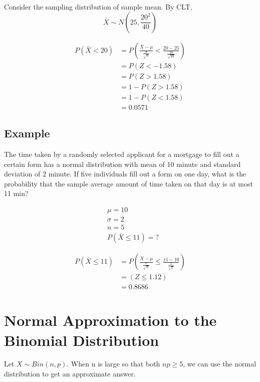 \documentclass{article}
\begin{document}
    Consider the sampling distribution of sample mean. By CLT, 
    \begin{equation*}
        \bar{X} \sim N(25, \frac{20^{2}}{40})
    \end{equation*}

    \begin{align*}
        P(\bar{X} < 20) &= P(\frac{\bar{X} - \mu}{ \frac{\sigma}{\sqrt{n}}} < \frac{20-25}{\frac{20}{\sqrt{40}}})\\
        &= P(Z<-1.58)\\
        &= P(Z>1.58)\\
        &= 1-P(Z>1.58)\\
        &= 1-P(Z<1.58)\\
        &= \boxed{0.0571}
    \end{align*}

    \subsection*{Example}
    The time taken by a randomly selected applicant for a mortgage to fill out a certain form has a normal distribution
    with mean of 10 minute and standard deviation of 2 minute. If five individuals fill out a form on one day, what is the
    probability that the sample average amount of time taken on that day is at most 11 min?

    \begin{align*}
        &\mu = 10\\
        &\sigma = 2\\
        &n = 5\\
        &P(\bar{X} \leq 11) = ?
    \end{align*}

    \begin{align*}
        P(\bar{X} \leq 11) &= P(\frac{\bar{X} - \mu}{ \frac{\sigma}{\sqrt{n}}} \leq \frac{11-10}{\frac{2}{\sqrt{5}}})\\
        &=(Z\leq 1.12)\\
        &= 0.8686
    \end{align*}

    \section*{Normal Approximation to the Binomial Distribution}
    Let $X \sim Bin(n, p)$. When n is large so that both $np\geq 5$, we can use the normal distribution to 
    get an approximate answer.
\end{document}
